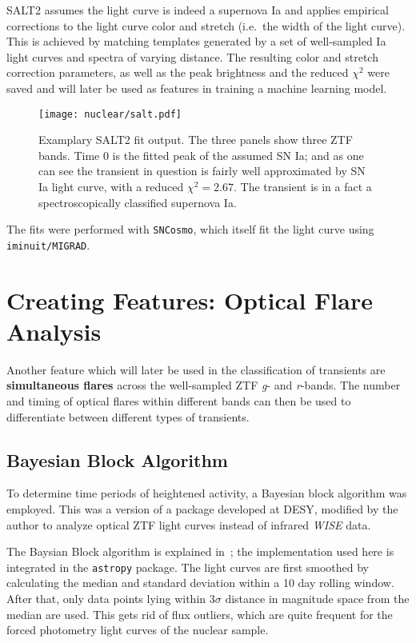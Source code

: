 SALT2 assumes the light curve is indeed a supernova Ia and applies empirical corrections to the light curve color and stretch (i.e.~the width of the light curve). This is achieved by matching templates generated by a set of well-sampled Ia light curves and spectra of varying distance. The resulting color and stretch correction parameters, as well as the peak brightness and the reduced $\chi^2$ were saved and will later be used as features in training a machine learning model.

\begin{figure}[H]
  \texttt{[image: nuclear/salt.pdf]}
  \caption[SALT2 Fit]{Examplary SALT2 fit output. The three panels show three ZTF bands. Time 0 is the fitted peak of the assumed SN Ia; and as one can see the transient in question is fairly well approximated by SN Ia light curve, with a reduced  $\chi^2=2.67$. The transient is in a fact a spectroscopically classified supernova Ia.}
\end{figure}

The fits were performed with \texttt{SNCosmo}, which itself fit the light curve using \texttt{iminuit/MIGRAD}.

\section{Creating Features: Optical Flare Analysis}\label{bayesian_blocks}
Another feature which will later be used in the classification of transients are \textbf{simultaneous flares} across the well-sampled ZTF \textit{g}- and \textit{r}-bands. The number and timing of optical flares within different bands can then be used to differentiate between different types of transients.

\subsection{Bayesian Block Algorithm}\label{bayesian_block}
To determine time periods of heightened activity, a Bayesian block algorithm was employed. This was a version of a package developed at DESY, modified by the author to analyze optical ZTF light curves instead of infrared \textit{WISE} data.

The Baysian Block algorithm is explained in~; the implementation used here is integrated in the \texttt{astropy} package. The light curves are first smoothed by calculating the median and standard deviation within a 10 day rolling window. After that, only data points lying within $3 \sigma$ distance in magnitude space from the median are used. This gets rid of flux outliers, which are quite frequent for the forced photometry light curves of the nuclear sample.

